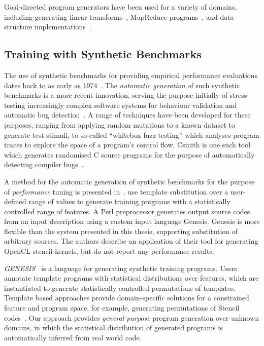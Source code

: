 Goal-directed program generators have been used for a variety of domains, including generating linear transforms~\cite{Voronenko2009}, MapReduce programs~\cite{Smith}, and data structure implementations~\cite{Loncaric2016}.

\subsection{Training with Synthetic Benchmarks}

The use of synthetic benchmarks for providing empirical performance
evaluations dates back to as early as 1974~\cite{Curnow1976}. The
\emph{automatic generation} of such synthetic benchmarks is a more
recent innovation, serving the purpose initially of stress-testing
increasingly complex software systems for behaviour validation and
automatic bug detection~\cite{Verplaetse2000,Godefroid2008}. A range
of techniques have been developed for these purposes, ranging from
applying random mutations to a known dataset to generate test stimuli,
to so-called ``whitebox fuzz testing'' which analyses program traces
to explore the space of a program's control flow. Csmith is one such
tool which generates randomised C source programs for the purpose of
automatically detecting compiler bugs~\cite{Yang2012}.

A method for the automatic generation of synthetic benchmarks for the
purpose of \emph{performance} tuning is presented
in~\cite{Chiu2015}. \citeauthor{Chiu2015} use template substitution
over a user-defined range of values to generate training programs with
a statistically controlled range of features. A Perl preprocessor
generates output source codes from an input description using a custom
input language Genesis. Genesis is more flexible than the system
presented in this thesis, supporting substitution of arbitrary
sources. The authors describe an application of their tool for
generating OpenCL stencil kernels, but do not report any performance
results.

\emph{GENESIS}~\cite{Chiu2015} is a language for generating synthetic training programs. Users annotate template programs with statistical distributions over features, which are instantiated to generate statistically controlled permutations of templates. Template based approaches provide domain-specific solutions for a constrained feature and program space, for example, generating permutations of Stencil codes~\cite{Garvey2015b,Cummins2015a}. Our approach provides \emph{general-purpose} program generation over unknown domains, in which the statistical distribution of generated programs is automatically inferred from real world code.

